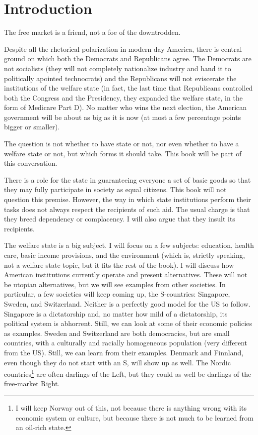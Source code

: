 \chapter{Introduction}

\begin{flushright}
The free market is a friend, not a foe of the downtrodden.
\end{flushright}

Despite all the rhetorical polarization in modern day America, there is central
ground on which both the Democrats and Republicans agree. The Democrats are not
socialists (they will not completely nationalize industry and hand it to
politically apointed technocrats) and the Republicans will not eviscerate the
institutions of the welfare state (in fact, the last time that Republicans
controlled both the Congress and the Presidency, they expanded the welfare
state, in the form of Medicare Part D). No matter who wins the next election,
the American government will be about as big as it is now (at most a few
percentage points bigger or smaller).

The question is not whether to have state or not, nor even whether to have a
welfare state or not, but which forms it should take. This book will be part of
this conversation.

There is a role for the state in guaranteeing everyone a set of basic goods so
that they may fully participate in society as equal citizens. This book will
not question this premise. However, the way in which state institutions perform
their tasks does not always respect the recipients of such aid. The usual
charge is that they breed dependency or complacency. I will also argue that
they insult its recipients.

\bigskip

The welfare state is a big subject. I will focus on a few subjects: education,
health care, basic income provisions, and the environment (which is, strictly
speaking, not a welfare state topic, but it fits the rest of the book). I will
discuss how American institutions currently operate and present alternatives.
These will not be utopian alternatives, but we will see examples from other
societies. In particular, a few societies will keep coming up, the S-countries:
Singapore, Sweden, and Switzerland. Neither is a perfectly good model for the
US to follow. Singapore is a dictatorship and, no matter how mild of a
dictatorship, its political system is abhorrent. Still, we can look at some of
their economic policies as examples. Sweden and Switzerland are both
democracies, but are small countries, with a culturally and racially
homogeneous population (very different from the US). Still, we can learn from
their examples. Denmark and Finnland, even though they do not start with an S,
will show up as well. The Nordic countries\footnote{I will keep Norway out of
this, not because there is anything wrong with its economic system or culture,
but because there is not much to be learned from an oil-rich state.} are often
darlings of the Left, but they could as well be darlings of the free-market
Right.

